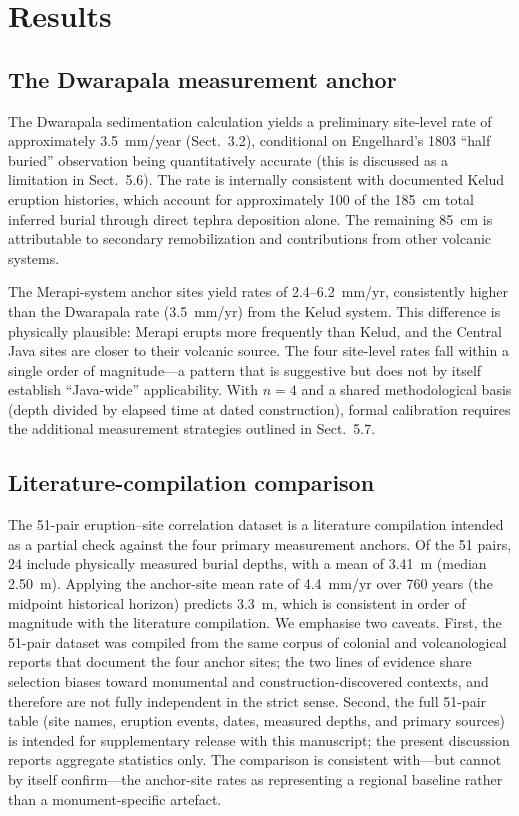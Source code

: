 \documentclass[12pt,a4paper]{article}
\begin{document}
\section{Results}

\subsection{The Dwarapala measurement anchor}

The Dwarapala sedimentation calculation yields a preliminary site-level rate of approximately 3.5~mm/year (Sect.~3.2), conditional on Engelhard's 1803 ``half buried'' observation being quantitatively accurate (this is discussed as a limitation in Sect.~5.6). The rate is internally consistent with documented Kelud eruption histories, which account for approximately 100 of the 185~cm total inferred burial through direct tephra deposition alone. The remaining 85~cm is attributable to secondary remobilization and contributions from other volcanic systems.

The Merapi-system anchor sites yield rates of 2.4--6.2~mm/yr, consistently higher than the Dwarapala rate (3.5~mm/yr) from the Kelud system. This difference is physically plausible: Merapi erupts more frequently than Kelud, and the Central Java sites are closer to their volcanic source. The four site-level rates fall within a single order of magnitude---a pattern that is suggestive but does not by itself establish ``Java-wide'' applicability. With $n=4$ and a shared methodological basis (depth divided by elapsed time at dated construction), formal calibration requires the additional measurement strategies outlined in Sect.~5.7.

\subsection{Literature-compilation comparison}

The 51-pair eruption--site correlation dataset is a literature compilation intended as a partial check against the four primary measurement anchors. Of the 51 pairs, 24 include physically measured burial depths, with a mean of 3.41~m (median 2.50~m). Applying the anchor-site mean rate of 4.4~mm/yr over 760 years (the midpoint historical horizon) predicts 3.3~m, which is consistent in order of magnitude with the literature compilation. We emphasise two caveats. First, the 51-pair dataset was compiled from the same corpus of colonial and volcanological reports that document the four anchor sites; the two lines of evidence share selection biases toward monumental and construction-discovered contexts, and therefore are not fully independent in the strict sense. Second, the full 51-pair table (site names, eruption events, dates, measured depths, and primary sources) is intended for supplementary release with this manuscript; the present discussion reports aggregate statistics only. The comparison is consistent with---but cannot by itself confirm---the anchor-site rates as representing a regional baseline rather than a monument-specific artefact.
\end{document}
